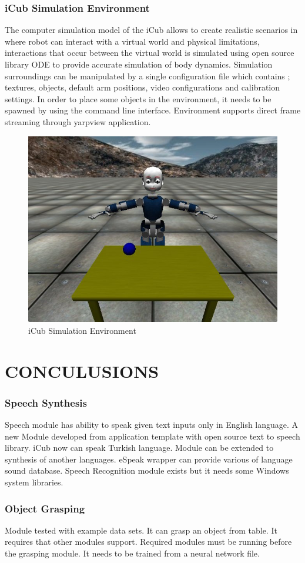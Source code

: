 \documentclass[a4paper, 11pt]{report}
\begin{document}
\subsection{iCub Simulation Environment}
The computer simulation model of the iCub allows to create realistic scenarios 
in where robot can interact with a virtual world and physical limitations, 
interactions that occur between the virtual world is simulated using open 
source library ODE to provide accurate simulation of body dynamics.
Simulation surroundings can be manipulated by a single configuration file which 
contains ; textures, objects, default arm positions, video configurations and 
calibration settings. In order to place some objects in the environment, it 
needs to be spawned by using the command line interface. Environment supports 
direct frame streaming through yarpview application.
\begin{figure}[h!]
\centering
\includegraphics[width=0.5\linewidth]{sim}
\caption{iCub Simulation Environment}
\label{fig:icub}
\end{figure}
\chapter{CONCULUSIONS}
\subsection{Speech Synthesis}
Speech module has ability to speak given text inputs only in English language. 
A new Module developed from application template with open source text to 
speech library. iCub now can speak Turkish language. Module can be extended to 
synthesis of another languages. eSpeak wrapper can provide various of language 
sound database. Speech Recognition module exists but it needs some Windows 
system libraries.
\subsection{Object Grasping}
Module tested with example data sets. It can grasp an object from table. It 
requires that other modules support. Required modules must be running before 
the grasping module. It needs to be trained from a neural network file.
\end{document}
